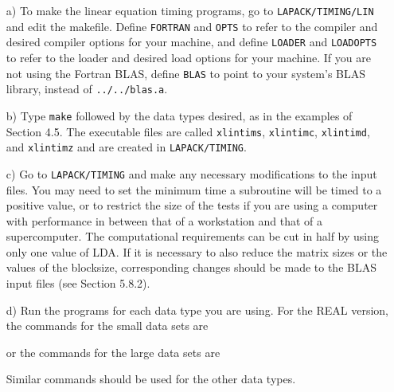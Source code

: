\begin{itemize}
\item[a)]
To make the linear equation timing programs,
go to {\tt LAPACK/TIMING/LIN} and edit the makefile.
Define {\tt FORTRAN} and {\tt OPTS} to refer to the compiler
and desired compiler options for your machine,
and define {\tt LOADER} and {\tt LOADOPTS} to refer to
the loader and desired load options for your machine.
If you are not using the Fortran BLAS, define {\tt BLAS}
to point to your system's BLAS library, instead of {\tt ../../blas.a}.

\item[b)]
Type {\tt make} followed by the data types desired, as in the examples
of Section 4.5.  The executable files are called {\tt xlintims},
{\tt xlintimc}, {\tt xlintimd}, and {\tt xlintimz} and are created
in {\tt LAPACK/TIMING}.

\item[c)]
Go to {\tt LAPACK/TIMING} and
make any necessary modifications to the input files.
You may need to set the minimum time a subroutine will
be timed to a positive value, or to restrict the size of the tests
if you are using a computer with performance in between that of a
workstation and that of a supercomputer.
The computational requirements can be cut in half by using only one
value of LDA.
If it is necessary to also reduce the matrix sizes or the values of
the blocksize, corresponding changes should be made to the 
BLAS input files (see Section 5.8.2).

\item[d)]
Run the programs for each data type you are using. 
For the REAL version, the commands for the small data sets are

or the commands for the large data sets are

\noindent
Similar commands should be used for the other data types.

\end{itemize}

